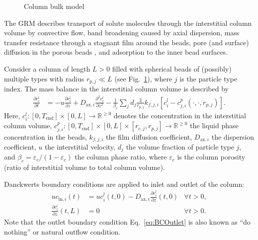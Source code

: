 \begin{figure}[!htb]
{
	}
	\caption{Column bulk model\label{fig:ModelGRMColumn}}
\end{figure}

The GRM describes transport of solute molecules through the interstitial column volume by convective flow, band broadening caused by axial dispersion, mass transfer resistance through a stagnant film around the beads, pore (and surface) diffusion in the porous beads \cite{Ma1996, Schneider1968a, Miyabe2007}, and adsorption to the inner bead surfaces.

Consider a column of length $L>0$ filled with spherical beads of (possibly) multiple types with radius $r_{p,j} \ll L$ (see Fig.~\ref{fig:ModelGRMColumn}), where $j$ is the particle type index. 
The mass balance in the interstitial column volume is described by
\begin{align}
	\frac{\partial c^l_i}{\partial t} &= -u \frac{\partial c^l_i}{\partial z} + D_{\text{ax},i} \frac{\partial^2 c^l_i}{\partial z^2} - \frac{1}{\beta_c} \sum_j d_j \frac{3}{r_{p,j}} k_{f,j,i} \left[ c^l_i - c^p_{j,i}(\cdot, \cdot, r_{p,j}) \right]. \label{eq:ModelColumn}
\end{align}
Here, $c^l_i\colon \left[0, T_{\text{end}}\right] \times [0, L] \rightarrow \mathds{R}^{\geq 0}$ denotes the concentration in the interstitial column volume, $c^p_{j,i}\colon \left[0, T_{\text{end}}\right] \times [0, L] \times [r_{c,j}, r_{p,j}] \rightarrow \mathds{R}^{\geq 0}$ the liquid phase concentration in the beads, $k_{f,j,i}$ the film diffusion coefficient, $D_{\text{ax},i}$ the dispersion coefficient, $u$ the interstitial velocity, $d_j$ the volume fraction of particle type $j$, and $\beta_c = \varepsilon_c / (1 - \varepsilon_c)$ the column phase ratio, where $\varepsilon_c$ is the column porosity (ratio of interstitial volume to total column volume).

Danckwerts boundary conditions \cite{Danckwerts1953} are applied to inlet and outlet of the column:
\begin{align}
	u c_{\text{in},i}(t) &= u c^l_i(t,0) - D_{\text{ax},i} \frac{\partial c^l_i}{\partial z}(t, 0) \label{eq:BCInlet} & \forall t > 0,\\
	\frac{\partial c^l_i}{\partial z}(t, L) &= 0 & \forall t > 0. \label{eq:BCOutlet}
\end{align}
Note that the outlet boundary condition Eq.~\eqref{eq:BCOutlet} is also known as ``do nothing'' or natural outflow condition.

